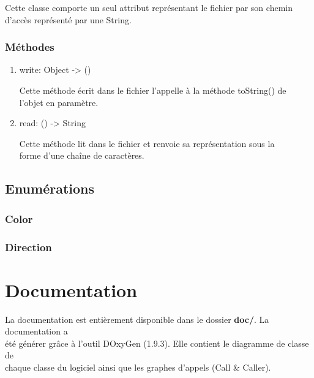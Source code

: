 \documentclass[11pt]{article}
\begin{document}
Cette classe comporte un seul attribut représentant le fichier par son chemin\\
d'accès représenté par une String.\\

\subsubsection{Méthodes}
\label{sec:org76b6c6b}
\begin{enumerate}
\item write: Object -> ()
\label{sec:orgdff2b62}



Cette méthode écrit dans le fichier l'appelle à la méthode toString() de\\
l'objet en paramètre.\\

\item read: () -> String
\label{sec:org7920cf7}

Cette méthode lit dans le fichier et renvoie sa représentation sous la\\
forme d'une chaîne de caractères.\\
\end{enumerate}

\subsection{Enumérations}
\label{sec:orgd049411}
\subsubsection{Color\label{orgcc866a3}}
\label{sec:org51b8318}
\subsubsection{Direction\label{orged4a61f}}
\label{sec:orgcb9d486}
\section{Documentation\label{org4590a0e}}
\label{sec:orgd8c6a14}

La documentation est entièrement disponible dans le dossier \textbf{doc/}. La documentation a\\
été générer grâce à l'outil DOxyGen (1.9.3). Elle contient le diagramme de classe de\\
chaque classe du logiciel ainsi que les graphes d'appels (Call \& Caller).\\
\end{document}
